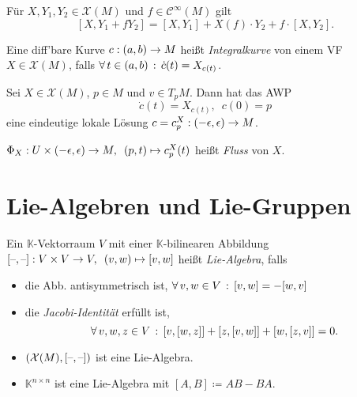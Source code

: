 \documentclass{cheat-sheet}
\newcommand{\K}{\mathbb{K}} %
\newcommand{\vinterval}{\ointerval{-\epsilon}{\epsilon}} %
\newcommand{\Cont}{\mathcal{C}} %
\newcommand{\VF}{\mathcal{X}} %
\begin{document}
\begin{satz}
  Für $X, Y_1, Y_2 \in \VF(M)$ und $f \in \Cont^\infty(M)$ gilt
  \[ [X, Y_1 + f Y_2] = [X, Y_1] + X(f) \cdot Y_2 + f \cdot [X, Y_2]. \]
\end{satz}


\begin{defn}
  Eine diff'bare Kurve $c : \left( a, b \right) \to M$ heißt \emph{Integralkurve} von einem VF $X \in \VF(M)$, falls
  $\forall \, {t \in \left( a, b \right)} \,:\, \dot{c}(t) = X_{c(t)}$.
\end{defn}

\begin{lemdefn}
  Sei $X \!\in\! \VF(M)$, $p \!\in\! M$ und $v \!\in\! T_p M$.
  Dann hat das AWP
  \[ \dot{c}(t) = X_{c(t)}, \enspace c(0) = p \]
  eine eindeutige lokale Lösung $c = c_p^X : \vinterval \to M$.
\end{lemdefn}

\begin{defn}
  $\Phi_X : U \times \vinterval \to M, \enspace (p, t) \mapsto c_p^X(t)$ heißt \emph{Fluss} von $X$.
\end{defn}

\section{Lie-Algebren und Lie-Gruppen}

\begin{defn}
  Ein $\K$-Vektorraum $V$ mit einer $\K$-bilinearen Abbildung $[\text{--},\text{--}] : V \times V \to V, \enspace (v, w) \mapsto [v,w]$ heißt \emph{Lie-Algebra}, falls
  \begin{itemize}
    \item die Abb. antisymmetrisch ist, \dh{} $\forall \, {v, w \in V} \,:\, [v, w] = - [w, v]$
    \item die \emph{Jacobi-Identität} erfüllt ist, \dh{}
    \[ \forall \, {v,w,z \in V} \,:\, [v, [w, z]] + [z, [v, w]] + [w, [z, v]] = 0. \]
  \end{itemize}
\end{defn}

\begin{bspe}
  \begin{itemize}
    \item $(\VF(M), [\blank,\blank])$ ist eine Lie-Algebra.
    \item $\K^{n \times n}$ ist eine Lie-Algebra mit $[A, B] \coloneqq AB - BA$.
  \end{itemize}
\end{bspe}
\end{document}
